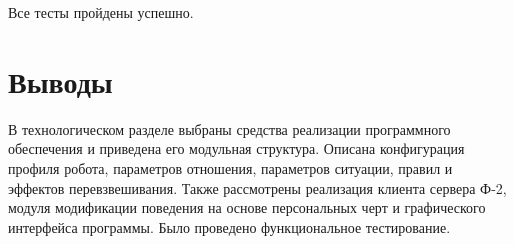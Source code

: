 Все тесты пройдены успешно.

\section*{Выводы}

В технологическом разделе выбраны средства реализации программного
обеспечения и приведена его модульная структура.
Описана конфигурация профиля робота, параметров отношения,
параметров ситуации, правил и эффектов перевзвешивания.
Также рассмотрены реализация клиента сервера Ф-2, модуля модификации поведения на
основе персональных черт и графического интерфейса программы.
Было проведено функциональное тестирование.
